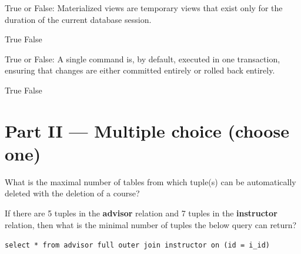 \documentclass[12pt, addpoints]{exam}
\begin{document}
\begin{questions}
\begin{minipage}{\linewidth}
\question[2]
True or False: Materialized views are temporary views that exist only for the duration of the current database session.\par\vspace{0.5em}
\begin{checkboxes}
    \choice True
    \CorrectChoice False
\end{checkboxes}
\end{minipage}\vspace{1em}

\begin{minipage}{\linewidth}
\question[2]
True or False: A single command is, by default, executed in one transaction, ensuring that changes are either committed entirely or rolled back entirely.\par\vspace{0.5em}
\begin{checkboxes}
    \CorrectChoice True
    \choice False
\end{checkboxes}
\end{minipage}\vspace{1em}

\section*{Part II — Multiple choice (choose one)}

\begin{minipage}{\linewidth}
\question[2]
What is the maximal number of tables from which tuple(s) can be automatically deleted with the deletion of a course?\par\vspace{0.5em}
\begin{checkboxes}
\end{checkboxes}
\end{minipage}\vspace{1em}

\begin{minipage}{\linewidth}
\question[2]
If there are 5 tuples in the \textbf{advisor} relation and 7 tuples in the \textbf{instructor} relation, 
then what is the minimal number of tuples the below query can return?\par\vspace{0.5em}

\texttt{select * from advisor full outer join instructor on (id = i\_id)}\par\vspace{0.5em}


\end{minipage}
\end{questions}
\end{document}
